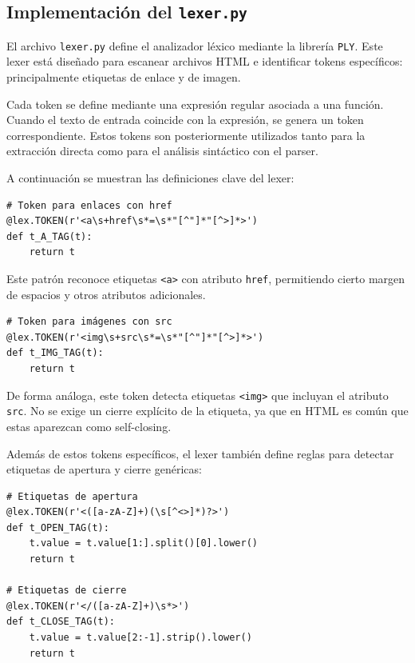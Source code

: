\documentclass[11pt,a4paper]{article}
\begin{document}
\subsection{Implementación del \texttt{lexer.py}}

El archivo \texttt{lexer.py} define el analizador léxico mediante la librería \texttt{PLY}. Este lexer está diseñado para escanear archivos HTML e identificar tokens específicos: principalmente etiquetas de enlace y de imagen.

\medskip

Cada token se define mediante una expresión regular asociada a una función. Cuando el texto de entrada coincide con la expresión, se genera un token correspondiente. Estos tokens son posteriormente utilizados tanto para la extracción directa como para el análisis sintáctico con el parser.

\medskip

A continuación se muestran las definiciones clave del lexer:

\begin{verbatim}
# Token para enlaces con href
@lex.TOKEN(r'<a\s+href\s*=\s*"[^"]*"[^>]*>')
def t_A_TAG(t):
    return t
\end{verbatim}

Este patrón reconoce etiquetas \texttt{<a>} con atributo \texttt{href}, permitiendo cierto margen de espacios y otros atributos adicionales.

\begin{verbatim}
# Token para imágenes con src
@lex.TOKEN(r'<img\s+src\s*=\s*"[^"]*"[^>]*>')
def t_IMG_TAG(t):
    return t
\end{verbatim}

De forma análoga, este token detecta etiquetas \texttt{<img>} que incluyan el atributo \texttt{src}. No se exige un cierre explícito de la etiqueta, ya que en HTML es común que estas aparezcan como self-closing.

\medskip

Además de estos tokens específicos, el lexer también define reglas para detectar etiquetas de apertura y cierre genéricas:

\begin{verbatim}
# Etiquetas de apertura
@lex.TOKEN(r'<([a-zA-Z]+)(\s[^<>]*)?>')
def t_OPEN_TAG(t):
    t.value = t.value[1:].split()[0].lower()
    return t

# Etiquetas de cierre
@lex.TOKEN(r'</([a-zA-Z]+)\s*>')
def t_CLOSE_TAG(t):
    t.value = t.value[2:-1].strip().lower()
    return t
\end{verbatim}
\end{document}
